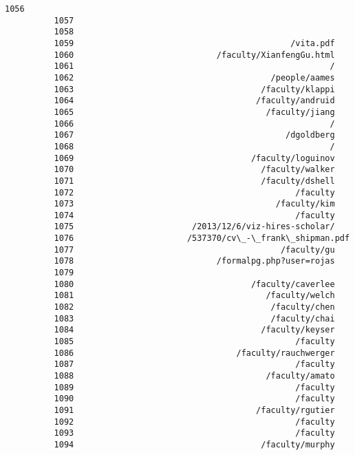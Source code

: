 \documentclass[11pt]{article}
\begin{document}
\begin{Verbatim}[commandchars=\\\{\}]
          1056                                                     
          1057                                                     
          1058                                                     
          1059                                            /vita.pdf
          1060                             /faculty/XianfengGu.html
          1061                                                    /
          1062                                        /people/aames
          1063                                      /faculty/klappi
          1064                                     /faculty/andruid
          1065                                       /faculty/jiang
          1066                                                    /
          1067                                           /dgoldberg
          1068                                                    /
          1069                                    /faculty/loguinov
          1070                                      /faculty/walker
          1071                                      /faculty/dshell
          1072                                             /faculty
          1073                                         /faculty/kim
          1074                                             /faculty
          1075                        /2013/12/6/viz-hires-scholar/
          1076                       /537370/cv\_-\_frank\_shipman.pdf
          1077                                          /faculty/gu
          1078                             /formalpg.php?user=rojas
          1079                                                     
          1080                                    /faculty/caverlee
          1081                                       /faculty/welch
          1082                                        /faculty/chen
          1083                                        /faculty/chai
          1084                                      /faculty/keyser
          1085                                             /faculty
          1086                                 /faculty/rauchwerger
          1087                                             /faculty
          1088                                       /faculty/amato
          1089                                             /faculty
          1090                                             /faculty
          1091                                     /faculty/rgutier
          1092                                             /faculty
          1093                                             /faculty
          1094                                      /faculty/murphy

\end{Verbatim}
\end{document}
